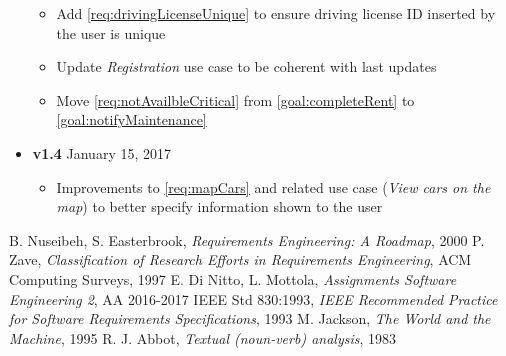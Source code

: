 \begin{appendices}
\begin{itemize}
\begin{itemize}
			\item Add \ref{req:drivingLicenseUnique} to ensure driving license ID inserted by the user is unique
			\item Update \emph{Registration} use case to be coherent with last updates
			\item Move \ref{req:notAvailbleCritical} from \ref{goal:completeRent} to \ref{goal:notifyMaintenance}
		\end{itemize}
		\item \textbf{v1.4} January 15, 2017
		\begin{itemize}
			\item Improvements to \ref{req:mapCars} and related use case (\emph{View cars on the map}) to better specify information shown to the user
		\end{itemize}
	\end{itemize}
\end{appendices}
\clearpage
\begin{thebibliography}{9}
B. Nuseibeh, S. Easterbrook, \emph{Requirements Engineering: A Roadmap}, 2000
P. Zave, \emph{Classification of Research Efforts in Requirements
Engineering}, ACM Computing Surveys, 1997
 E. Di Nitto, L. Mottola, \emph{Assignments Software Engineering 2}, AA 2016-2017
IEEE Std 830:1993, \emph{IEEE Recommended Practice for Software Requirements Specifications}, 1993
M. Jackson, \emph{The World and the Machine}, 1995
R. J. Abbot, \emph{Textual (noun-verb) analysis}, 1983
\end{thebibliography}